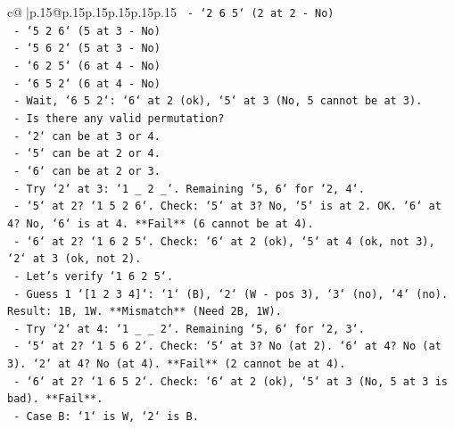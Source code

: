 \documentclass{article}
\begin{document}
{\begin{supertabular}{c@{$\;$}|p{.15\linewidth}@{}p{.15\linewidth}p{.15\linewidth}p{.15\linewidth}p{.15\linewidth}p{.15\linewidth}}
{{{\texttt{                                {-} `2 6 5` (2 at 2 {-} No)} \\
\texttt{                                {-} `5 2 6` (5 at 3 {-} No)} \\
\texttt{                                {-} `5 6 2` (5 at 3 {-} No)} \\
\texttt{                                {-} `6 2 5` (6 at 4 {-} No)} \\
\texttt{                                {-} `6 5 2` (6 at 4 {-} No)} \\
\texttt{                            {-} Wait, `6 5 2`: `6` at 2 (ok), `5` at 3 (No, 5 cannot be at 3).} \\
\texttt{                            {-} Is there any valid permutation?} \\
\texttt{                            {-} `2` can be at 3 or 4.} \\
\texttt{                            {-} `5` can be at 2 or 4.} \\
\texttt{                            {-} `6` can be at 2 or 3.} \\
\texttt{                            {-} Try `2` at 3: `1 \_ 2 \_`. Remaining `5, 6` for `2, 4`.} \\
\texttt{                                {-} `5` at 2? `1 5 2 6`. Check: `5` at 3? No, `5` is at 2. OK. `6` at 4? No, `6` is at 4. **Fail** (6 cannot be at 4).} \\
\texttt{                                {-} `6` at 2? `1 6 2 5`. Check: `6` at 2 (ok), `5` at 4 (ok, not 3), `2` at 3 (ok, not 2).} \\
\texttt{                                {-} Let's verify `1 6 2 5`.} \\
\texttt{                                    {-} Guess 1 `{[}1 2 3 4{]}`: `1` (B), `2` (W {-} pos 3), `3` (no), `4` (no). Result: 1B, 1W. **Mismatch** (Need 2B, 1W).} \\
\texttt{                            {-} Try `2` at 4: `1 \_ \_ 2`. Remaining `5, 6` for `2, 3`.} \\
\texttt{                                {-} `5` at 2? `1 5 6 2`. Check: `5` at 3? No (at 2). `6` at 4? No (at 3). `2` at 4? No (at 4). **Fail** (2 cannot be at 4).} \\
\texttt{                                {-} `6` at 2? `1 6 5 2`. Check: `6` at 2 (ok), `5` at 3 (No, 5 at 3 is bad). **Fail**.} \\
\texttt{                        {-} Case B: `1` is W, `2` is B.} \\
}}}
\end{supertabular}}
\end{document}
